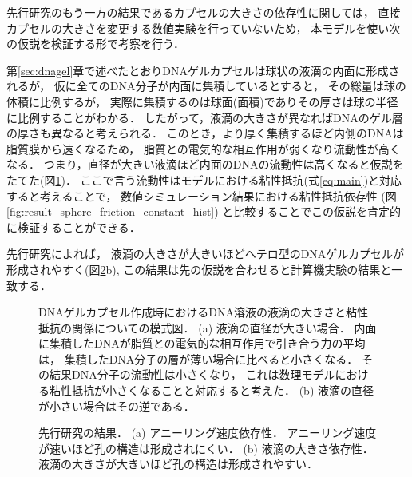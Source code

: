 先行研究のもう一方の結果であるカプセルの大きさの依存性に関しては，
直接カプセルの大きさを変更する数値実験を行っていないため，
本モデルを使い次の仮説を検証する形で考察を行う．

第\ref{sec:dnagel}章で述べたとおりDNAゲルカプセルは球状の液滴の内面に形成されるが，
仮に全てのDNA分子が内面に集積しているとすると，
その総量は球の体積に比例するが，
実際に集積するのは球面(面積)でありその厚さは球の半径に比例することがわかる．
したがって，液滴の大きさが異なればDNAのゲル層の厚さも異なると考えられる．
このとき，より厚く集積するほど内側のDNAは脂質膜から遠くなるため，
脂質との電気的な相互作用が弱くなり流動性が高くなる．
つまり，直径が大きい液滴ほど内面のDNAの流動性は高くなると仮説をたてた(図\ref{fig:size_and_friction})．
ここで言う流動性はモデルにおける粘性抵抗(式\ref{eq:main})と対応すると考えることで，
数値シミュレーション結果における粘性抵抗依存性
(図\ref{fig:result_sphere_friction_constant_hist})
と比較することでこの仮説を肯定的に検証することができる．

先行研究によれば，
液滴の大きさが大きいほどヘテロ型のDNAゲルカプセルが形成されやすく(図\ref{fig:result_moritasan}b), 
この結果は先の仮説を合わせると計算機実験の結果と一致する．

\begin{figure}
\centering

\caption{
    DNAゲルカプセル作成時におけるDNA溶液の液滴の大きさと粘性抵抗の関係についての模式図．
    (a) 液滴の直径が大きい場合．
        内面に集積したDNAが脂質との電気的な相互作用で引き合う力の平均は，
        集積したDNA分子の層が薄い場合に比べると小さくなる．
        その結果DNA分子の流動性は小さくなり，
        これは数理モデルにおける粘性抵抗が小さくなることと対応すると考えた．
    (b) 液滴の直径が小さい場合はその逆である．
}
\label{fig:size_and_friction}
\end{figure}

\begin{figure}
\centering

\caption{
    先行研究の結果\cite{moritasan}．
    (a) アニーリング速度依存性．
        アニーリング速度が速いほど孔の構造は形成されにくい．
    (b) 液滴の大きさ依存性．
        液滴の大きさが大きいほど孔の構造は形成されやすい．
}
\label{fig:result_moritasan}
\end{figure}
